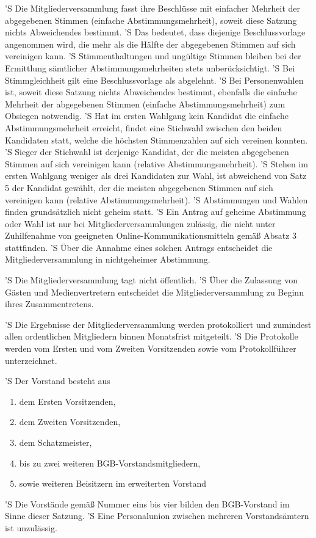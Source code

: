 \documentclass[a4paper,10pt]{scrreprt}
\begin{document}
\begin{contract}
'S Die Mitgliederversammlung fasst ihre Beschlüsse mit einfacher Mehrheit der
abgegebenen Stimmen (einfache Abstimmungsmehrheit), soweit diese Satzung nichts
Abweichendes bestimmt.
'S Das bedeutet, dass diejenige Beschlussvorlage angenommen wird, die mehr als
die Hälfte der abgegebenen Stimmen auf sich vereinigen kann.
'S Stimmenthaltungen und ungültige Stimmen bleiben bei der Ermittlung
sämtlicher Abstimmungsmehrheiten stets unberücksichtigt.
'S Bei Stimmgleichheit gilt eine Beschlussvorlage als abgelehnt.
'S Bei Personenwahlen ist, soweit diese Satzung nichts Abweichendes bestimmt,
ebenfalls die einfache Mehrheit der abgegebenen Stimmen (einfache
Abstimmungsmehrheit) zum Obsiegen notwendig.
'S Hat im ersten Wahlgang kein Kandidat die einfache Abstimmungsmehrheit
erreicht, findet eine Stichwahl zwischen den beiden Kandidaten statt, welche
die höchsten Stimmenzahlen auf sich vereinen konnten.
'S Sieger der Stichwahl ist derjenige Kandidat, der die meisten abgegebenen
Stimmen auf sich vereinigen kann (relative Abstimmungsmehrheit).
'S Stehen im ersten Wahlgang weniger als drei Kandidaten zur Wahl, ist
abweichend von Satz 5 der Kandidat gewählt, der die meisten abgegebenen Stimmen
auf sich vereinigen kann (relative Abstimmungsmehrheit).
'S Abstimmungen und Wahlen finden grundsätzlich nicht geheim statt.
'S Ein Antrag auf geheime Abstimmung oder Wahl ist nur bei
Mitgliederversammlungen zulässig, die nicht unter Zuhilfenahme von geeigneten
Online-Kommunikationsmitteln gemäß Absatz 3 stattfinden.
'S Über die Annahme eines solchen Antrags entscheidet die Mitgliederversammlung
in nichtgeheimer Abstimmung.

'S Die Mitgliederversammlung tagt nicht öffentlich.
'S Über die Zulassung von Gästen und Medienvertretern entscheidet die
Mitgliederversammlung zu Beginn ihres Zusammentretens.

'S Die Ergebnisse der Mitgliederversammlung werden protokolliert und zumindest
allen ordentlichen Mitgliedern binnen Monatsfrist mitgeteilt.
'S Die Protokolle werden vom Ersten und vom Zweiten Vorsitzenden sowie vom
Protokollführer unterzeichnet.


'S Der Vorstand besteht aus
\begin{enumerate}
	\item dem Ersten Vorsitzenden,
	\item dem Zweiten Vorsitzenden,
	\item dem Schatzmeister,
	\item bis zu zwei weiteren BGB-Vorstandsmitgliedern,
	\item sowie weiteren Beisitzern im erweiterten Vorstand
\end{enumerate}
\label{vorstands-definition}
'S Die Vorstände gemäß Nummer eins bis vier bilden den BGB-Vorstand im Sinne dieser Satzung.
'S Eine Personalunion zwischen mehreren Vorstandsämtern ist unzulässig.


\end{contract}
\end{document}
